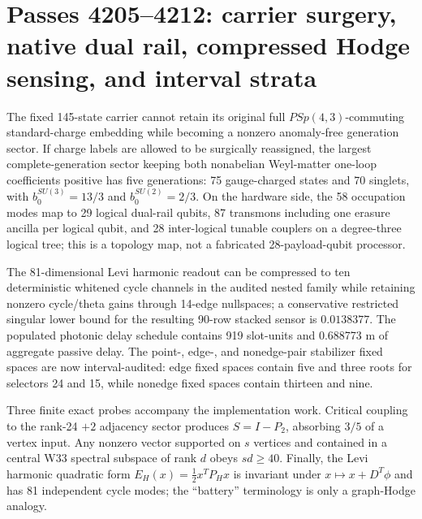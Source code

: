 \section{Passes 4205--4212: carrier surgery, native dual rail, compressed Hodge sensing, and interval strata}
The fixed 145-state carrier cannot retain its original full $PSp(4,3)$-commuting standard-charge embedding while becoming a nonzero anomaly-free generation sector.  If charge labels are allowed to be surgically reassigned, the largest complete-generation sector keeping both nonabelian Weyl-matter one-loop coefficients positive has five generations: 75 gauge-charged states and 70 singlets, with $b_0^{SU(3)}=13/3$ and $b_0^{SU(2)}=2/3$.  On the hardware side, the 58 occupation modes map to 29 logical dual-rail qubits, 87 transmons including one erasure ancilla per logical qubit, and 28 inter-logical tunable couplers on a degree-three logical tree; this is a topology map, not a fabricated 28-payload-qubit processor.

The 81-dimensional Levi harmonic readout can be compressed to ten deterministic whitened cycle channels in the audited nested family while retaining nonzero cycle/theta gains through 14-edge nullspaces; a conservative restricted singular lower bound for the resulting 90-row stacked sensor is $0.0138377$.  The populated photonic delay schedule contains 919 slot-units and 0.688773 m of aggregate passive delay.  The point-, edge-, and nonedge-pair stabilizer fixed spaces are now interval-audited: edge fixed spaces contain five and three roots for selectors 24 and 15, while nonedge fixed spaces contain thirteen and nine.

Three finite exact probes accompany the implementation work.  Critical coupling to the rank-24 $+2$ adjacency sector produces $S=I-P_2$, absorbing $3/5$ of a vertex input.  Any nonzero vector supported on $s$ vertices and contained in a central W33 spectral subspace of rank $d$ obeys $sd\ge 40$.  Finally, the Levi harmonic quadratic form $E_H(x)=\tfrac12 x^T P_Hx$ is invariant under $x\mapsto x+D^T\phi$ and has 81 independent cycle modes; the ``battery'' terminology is only a graph-Hodge analogy.
